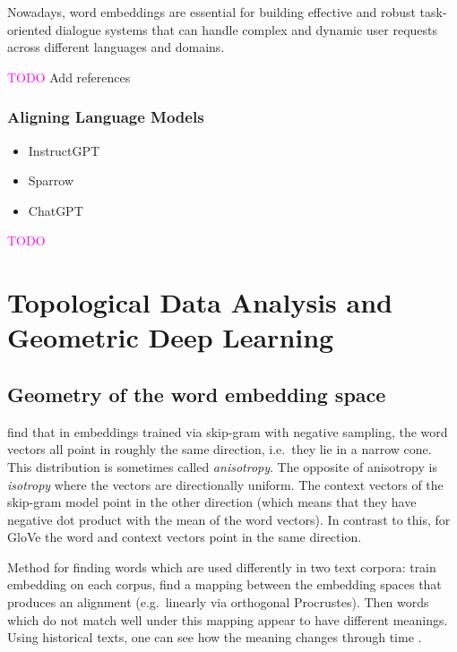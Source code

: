 \documentclass[11pt, a4paper]{amsart}
\begin{document}
Nowadays, word embeddings are essential for building effective and robust task-oriented dialogue systems that can handle complex and dynamic user requests across different languages and domains.

\textcolor{magenta}{TODO} Add references


\subsubsection{Aligning Language Models}

\begin{itemize}
	\item InstructGPT  \cite{ouyang2022training}
	\item Sparrow
	\item ChatGPT
\end{itemize}

\textcolor{magenta}{TODO}

\section{Topological Data Analysis and Geometric Deep Learning}

\subsection{Geometry of the word embedding space}

\cite{mimno-thompson-2017-strange} find that in embeddings trained via skip-gram with negative sampling, the word vectors all point in roughly the same direction, i.e.\ they lie in a narrow cone.
This distribution is sometimes called \emph{anisotropy}.
The opposite of anisotropy is \emph{isotropy} where the vectors are directionally uniform.
The context vectors of the skip-gram model point in the other direction (which means that they have negative dot product with the mean of the word vectors).
In contrast to this, for GloVe the word and context vectors point in the same direction.

Method for finding words which are used differently in two text corpora:
train embedding on each corpus, find a mapping between the embedding spaces that produces an alignment (e.g.\ linearly via orthogonal Procrustes).
Then words which do not match well under this mapping appear to have different meanings.
Using historical texts, one can see how the meaning changes through time \cite{hamilton-etal-2016-diachronic}.
\end{document}
